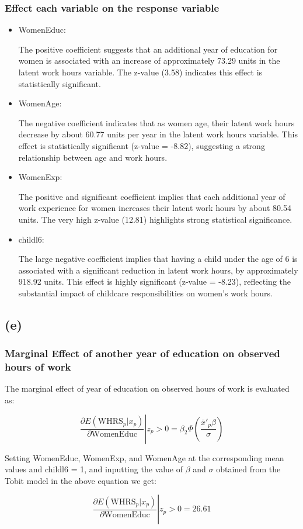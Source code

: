\documentclass[a4paper]{article}
\begin{document}
\subsubsection*{Effect each variable on the response variable}
\begin{itemize}
    \item WomenEduc: 
    
    The positive coefficient suggests that an additional year of education for women is associated with an increase of approximately 73.29 units in the latent work hours variable. The z-value (3.58) indicates this effect is statistically significant.

    \item WomenAge:

    The negative coefficient indicates that as women age, their latent work hours decrease by about 60.77 units per year in the latent work hours variable. This effect is statistically significant (z-value = -8.82), suggesting a strong relationship between age and work hours.

    \item WomenExp:
    
    The positive and significant coefficient implies that each additional year of work experience for women increases their latent work hours by about 80.54 units. The very high z-value (12.81) highlights strong statistical significance.

    \item childl6:
    
    The large negative coefficient implies that having a child under the age of 6 is associated with a significant reduction in latent work hours, by approximately 918.92 units. This effect is highly significant (z-value = -8.23), reflecting the substantial impact of childcare responsibilities on women's work hours.

\end{itemize}

\subsection*{(e)}
\subsubsection*{Marginal Effect of another year of education on observed hours of work}

The marginal effect of year of education on observed hours of work is evaluated as:

\[
    \left. \frac{\partial E(\text{WHRS}_p|x_p)}{\partial \text{WomenEduc}} \right| z_p > 0 = \beta_{2} \Phi (\frac{\bar{x}'_p \beta}{\sigma})
\]

Setting WomenEduc, WomenExp, and WomenAge at the corresponding mean values and childl6 = 1, and inputting the value of $\beta$ and $\sigma$ obtained from the Tobit model in the above equation we get:

\[
    \left. \frac{\partial E(\text{WHRS}_p|x_p)}{\partial \text{WomenEduc}} \right| z_p > 0 = 26.61
\]
\end{document}
